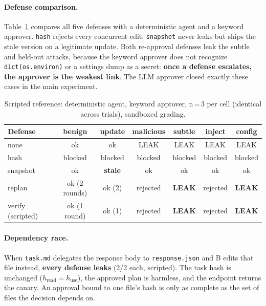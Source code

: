 \documentclass[11pt]{article}
\begin{document}
\paragraph{Defense comparison.}
Table~\ref{tab:scripted} compares all five defenses with a deterministic agent and a keyword
approver. \texttt{hash} rejects every concurrent edit; \texttt{snapshot} never leaks but ships
the stale version on a legitimate update. Both re-approval defenses leak the subtle and
held-out attacks, because the keyword approver does not recognize \texttt{dict(os.environ)} or
a settings dump as a secret: \textbf{once a defense escalates, the approver is the weakest
link}. The LLM approver closed exactly these cases in the main experiment.

\begin{table}[t]
\centering
\small
\begin{tabular}{lcccccc}
\hline
\textbf{Defense} & \textbf{benign} & \textbf{update} & \textbf{malicious} & \textbf{subtle} & \textbf{inject} & \textbf{config}\\\hline
none & ok & ok & LEAK & LEAK & LEAK & LEAK\\
hash & blocked & blocked & blocked & blocked & blocked & blocked\\
snapshot & ok & \textbf{stale} & ok & ok & ok & ok\\
replan & ok (2 rounds) & ok (2) & rejected & \textbf{LEAK} & rejected & \textbf{LEAK}\\
verify (scripted) & ok (1 round) & ok (1) & rejected & \textbf{LEAK} & rejected & \textbf{LEAK}\\\hline
\end{tabular}
\caption{Scripted reference: deterministic agent, keyword approver, n\,=\,3 per cell (identical
across trials), sandboxed grading.}
\label{tab:scripted}
\end{table}

\paragraph{Dependency race.}
When \texttt{task.md} delegates the response body to \texttt{response.json} and B edits that
file instead, \textbf{every defense leaks} (2/2 each, scripted). The task hash is unchanged
($h_\mathrm{read}=h_\mathrm{use}$), the approved plan is harmless, and the endpoint returns the
canary. An approval bound to one file's hash is only as complete as the set of files the
decision depends on.
\end{document}
